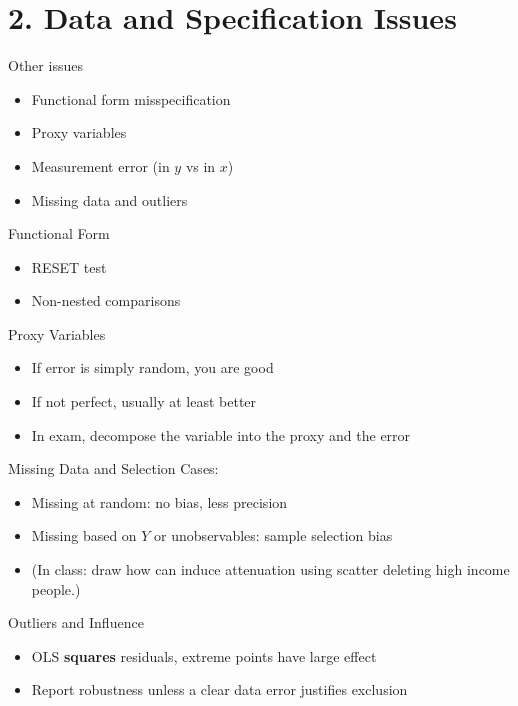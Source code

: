 \documentclass[aspectratio=169]{beamer}
\begin{document}
\section{2. Data and Specification Issues}

\begin{frame}{Other issues}
\begin{itemize}
	\item Functional form misspecification
	\item Proxy variables
	\item Measurement error (in $y$ vs in $x$)
	\item Missing data and outliers
\end{itemize}
\end{frame}

\begin{frame}{Functional Form}
\begin{itemize}
	\item RESET test
	\item Non-nested comparisons
\end{itemize}
\end{frame}

\begin{frame}{Proxy Variables}
\begin{itemize}
	\item If error is simply random, you are good
	\item If not perfect, usually at least better
	\item In exam, decompose the variable into the proxy and the error
\end{itemize}
\end{frame}


\begin{frame}{Missing Data and Selection}
Cases:
\begin{itemize}
	\item Missing at random: no bias, less precision
	\item Missing based on $Y$ or unobservables: sample selection bias
	\item (In class: draw how can induce attenuation using scatter deleting high income people.)
\end{itemize}
\end{frame}

\begin{frame}{Outliers and Influence}
\begin{itemize}
	\item OLS \textbf{squares} residuals, extreme points have large effect
	\item Report robustness unless a clear data error justifies exclusion
\end{itemize}
\end{frame}
\end{document}
